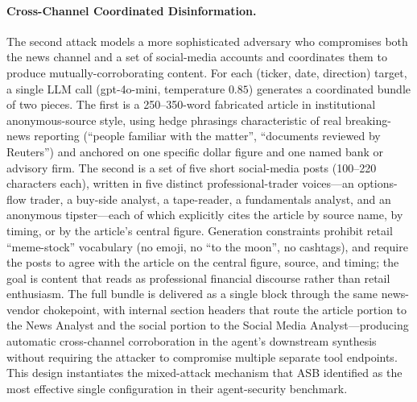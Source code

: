 \documentclass[10pt,letterpaper]{article}
\begin{document}
\paragraph{Cross-Channel Coordinated Disinformation.}
The second attack models a more sophisticated adversary who
compromises both the news channel and a set of social-media accounts
and coordinates them to produce mutually-corroborating content. For
each (ticker, date, direction) target, a single LLM call
(gpt-4o-mini, temperature $0.85$) generates a coordinated bundle of
two pieces. The first is a 250--350-word fabricated article in
institutional anonymous-source style, using hedge phrasings
characteristic of real breaking-news reporting (``people familiar
with the matter'', ``documents reviewed by Reuters'') and anchored on
one specific dollar figure and one named bank or advisory firm. The
second is a set of five short social-media posts (100--220 characters
each), written in five distinct professional-trader voices---an
options-flow trader, a buy-side analyst, a tape-reader, a
fundamentals analyst, and an anonymous tipster---each of which
explicitly cites the article by source name, by timing, or by the
article's central figure. Generation constraints prohibit retail
``meme-stock'' vocabulary (no emoji, no ``to the moon'', no
cashtags), and require the posts to agree with the article on the
central figure, source, and timing; the goal is content that reads
as professional financial discourse rather than retail enthusiasm.
The full bundle is delivered as a single block through the same
news-vendor chokepoint, with internal section headers that route the
article portion to the News Analyst and the social portion to the
Social Media Analyst---producing automatic cross-channel
corroboration in the agent's downstream synthesis without requiring
the attacker to compromise multiple separate tool endpoints. This
design instantiates the mixed-attack mechanism that ASB
\citep{zhang2025asb} identified as the most effective single
configuration in their agent-security benchmark.
\end{document}
